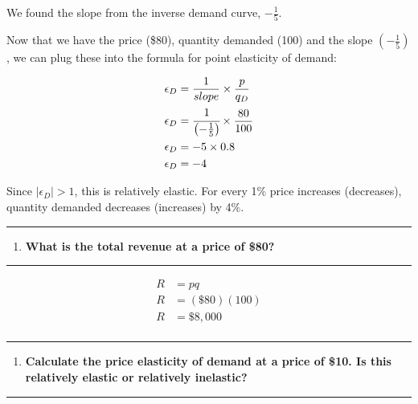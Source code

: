 \documentclass[
  11pt,
]{article}
\providecommand{\tightlist}{%
  \setlength{\itemsep}{0pt}\setlength{\parskip}{0pt}}
\begin{document}
We found the slope from the inverse demand curve, \(-\frac{1}{5}\).

Now that we have the price (\$80), quantity demanded (100) and the slope
\((-\frac{1}{5})\), we can plug these into the formula for point
elasticity of demand:

\[\begin{aligned}
    \epsilon_D &= \frac{1}{slope} \times \frac{p}{q_D}\\
    \epsilon_D &= \cfrac{1}{\left(-\frac{1}{5}\right)} \times \frac{80}{100}\\ 
    \epsilon_D &= -5 \times 0.8 \\
    \epsilon_D &= -4\\ 
    \end{aligned}\]

Since \(|\epsilon_D| >1\), this is relatively elastic. For every 1\%
price increases (decreases), quantity demanded decreases (increases) by
4\%.

\begin{center}\rule{0.5\linewidth}{0.5pt}\end{center}

\begin{enumerate}
\def\labelenumi{\alph{enumi}.}
\setcounter{enumi}{2}
\tightlist
\item
  \textbf{What is the total revenue at a price of \$80?}
\end{enumerate}

\begin{center}\rule{0.5\linewidth}{0.5pt}\end{center}

\[\begin{aligned}
    R&=pq   \\
    R&=(\$80)(100)\\
    R&=\$8,000  \\
    \end{aligned}\]

\begin{center}\rule{0.5\linewidth}{0.5pt}\end{center}

\begin{enumerate}
\def\labelenumi{\alph{enumi}.}
\setcounter{enumi}{3}
\tightlist
\item
  \textbf{Calculate the price elasticity of demand at a price of \$10.
  Is this relatively elastic or relatively inelastic?}
\end{enumerate}

\begin{center}\rule{0.5\linewidth}{0.5pt}\end{center}
\end{document}
